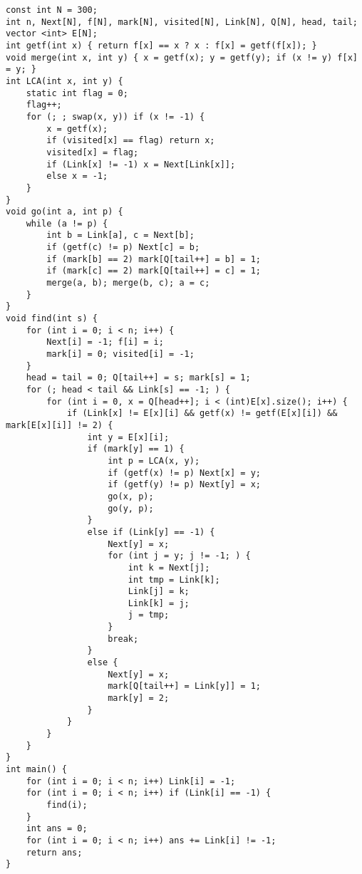 \begin{lstlisting}
const int N = 300;
int n, Next[N], f[N], mark[N], visited[N], Link[N], Q[N], head, tail;
vector <int> E[N];
int getf(int x) { return f[x] == x ? x : f[x] = getf(f[x]); }
void merge(int x, int y) { x = getf(x); y = getf(y); if (x != y) f[x] = y; }
int LCA(int x, int y) {
	static int flag = 0;
	flag++;
	for (; ; swap(x, y)) if (x != -1) {
		x = getf(x);
		if (visited[x] == flag) return x;
		visited[x] = flag;
		if (Link[x] != -1) x = Next[Link[x]];
		else x = -1;
	}
}
void go(int a, int p) {
	while (a != p) {
		int b = Link[a], c = Next[b];
		if (getf(c) != p) Next[c] = b;
		if (mark[b] == 2) mark[Q[tail++] = b] = 1;
		if (mark[c] == 2) mark[Q[tail++] = c] = 1;
		merge(a, b); merge(b, c); a = c;
	}
}
void find(int s) {
	for (int i = 0; i < n; i++) {
		Next[i] = -1; f[i] = i;
		mark[i] = 0; visited[i] = -1;
	}
	head = tail = 0; Q[tail++] = s; mark[s] = 1;
	for (; head < tail && Link[s] == -1; ) {
		for (int i = 0, x = Q[head++]; i < (int)E[x].size(); i++) {
			if (Link[x] != E[x][i] && getf(x) != getf(E[x][i]) && mark[E[x][i]] != 2) {
				int y = E[x][i];
				if (mark[y] == 1) {
					int p = LCA(x, y);
					if (getf(x) != p) Next[x] = y;
					if (getf(y) != p) Next[y] = x;
					go(x, p);
					go(y, p);
				}
				else if (Link[y] == -1) {
					Next[y] = x;
					for (int j = y; j != -1; ) {
						int k = Next[j];
						int tmp = Link[k];
						Link[j] = k;
						Link[k] = j;
						j = tmp;
					}
					break;
				}
				else {
					Next[y] = x;
					mark[Q[tail++] = Link[y]] = 1;
					mark[y] = 2;
				}
			}
		}
	}
}
int main() {
	for (int i = 0; i < n; i++) Link[i] = -1;
	for (int i = 0; i < n; i++) if (Link[i] == -1) {
		find(i);
	}
	int ans = 0;
	for (int i = 0; i < n; i++) ans += Link[i] != -1;
	return ans;
}
	\end{lstlisting}
